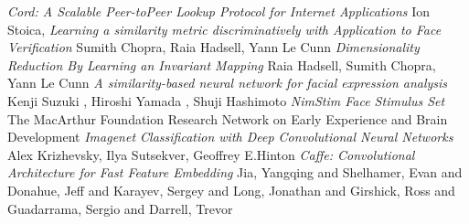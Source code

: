 \documentclass[10pt,twocolumn,letterpaper]{article}
\begin{document}
\begin{thebibliography}{9}
 \emph{Cord: A Scalable Peer-toPeer Lookup Protocol for Internet Applications}  Ion Stoica,
 \emph{Learning a similarity metric discriminatively with Application to Face Verification}  Sumith Chopra, Raia Hadsell, Yann Le Cunn
 \emph{Dimensionality Reduction By Learning an Invariant Mapping} Raia Hadsell, Sumith Chopra, Yann Le Cunn
 \emph{A similarity-based neural network for facial expression analysis} Kenji Suzuki , Hiroshi Yamada , Shuji Hashimoto
 \emph{NimStim Face Stimulus Set} The MacArthur Foundation Research Network on Early Experience and Brain Development
 \emph{Imagenet Classification with Deep Convolutional Neural Networks} Alex Krizhevsky, Ilya Sutsekver, Geoffrey E.Hinton
 \emph{Caffe: Convolutional Architecture for Fast Feature Embedding} Jia, Yangqing and Shelhamer, Evan and Donahue, Jeff and Karayev, Sergey and Long, Jonathan and Girshick, Ross and Guadarrama, Sergio and Darrell, Trevor
\end{thebibliography}
{\small


} 
\end{document}
